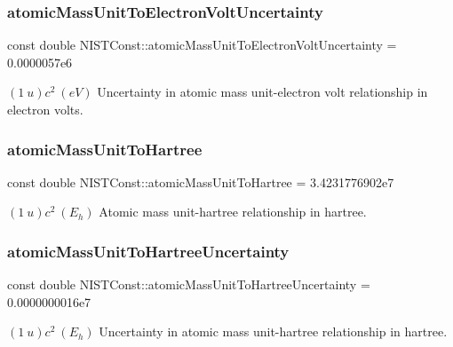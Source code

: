 \subsubsection{\texorpdfstring{atomic\+Mass\+Unit\+To\+Electron\+Volt\+Uncertainty}{atomicMassUnitToElectronVoltUncertainty}}
{\footnotesize\ttfamily const double N\+I\+S\+T\+Const\+::atomic\+Mass\+Unit\+To\+Electron\+Volt\+Uncertainty = 0.\+0000057e6}

$(1\ u)c^2 \ (eV)$ Uncertainty in atomic mass unit-\/electron volt relationship in electron volts. \mbox{\label{group___atomic_mass_unit_ga8a6b352e1a13d0cbbc0f36f650e2c682}} 
\subsubsection{\texorpdfstring{atomic\+Mass\+Unit\+To\+Hartree}{atomicMassUnitToHartree}}
{\footnotesize\ttfamily const double N\+I\+S\+T\+Const\+::atomic\+Mass\+Unit\+To\+Hartree = 3.\+4231776902e7}

$(1\ u)c^2 \ (E_h)$ Atomic mass unit-\/hartree relationship in hartree. \mbox{\label{group___atomic_mass_unit_ga99d6950b6326e7131f95abe5c90fb8da}} 
\subsubsection{\texorpdfstring{atomic\+Mass\+Unit\+To\+Hartree\+Uncertainty}{atomicMassUnitToHartreeUncertainty}}
{\footnotesize\ttfamily const double N\+I\+S\+T\+Const\+::atomic\+Mass\+Unit\+To\+Hartree\+Uncertainty = 0.\+0000000016e7}

$(1\ u)c^2 \ (E_h)$ Uncertainty in atomic mass unit-\/hartree relationship in hartree. \mbox{\label{group___atomic_mass_unit_gad284f1982f0182e1e4a90e0bff793af9}} 
